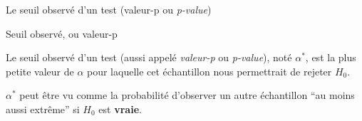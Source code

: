 \documentclass{BeamerTemplate}
\begin{document}
\begin{frame}[t]{Le seuil observé d'un test  (valeur-p ou {\it p-value})}


\begin{Boite}{Seuil observé, ou valeur-p}
{\small Le seuil observé d'un test (aussi appelé {\it valeur-p} ou {\it p-value}),  noté $\alpha^*$,  est la \alert{plus petite valeur de $\alpha$} pour laquelle cet échantillon nous permettrait de rejeter  $H_0$.

 \vspace{3mm}

 $\alpha^*$ peut être vu comme la \alert{probabilité d'observer un autre échantillon  ``au moins aussi extrême'' \alert{si $H_0$ est {\bf vraie}}.}}
\end{Boite}



\end{frame}







 



\end{document}
